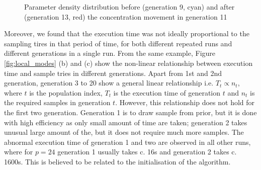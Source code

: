 \begin{figure}[t]
    \begin{center}
    \end{center}

    \caption[Parameter density distribution before and after the concentration movement in generation 11]{Parameter density distribution before (generation 9, cyan) and after (generation 13, red) the concentration movement in generation 11}
    \label{fig:local_para}
\end{figure}

Moreover, we found that the execution time was not ideally proportional to the sampling tires in that period of time, for both different repeated runs and different generations in a single run. From the same example, Figure \ref{fig:local_modes} (b) and (c) show the non-linear relationship between execution time and sample tries in different generations. Apart from 1st and 2nd generation, generation 3 to 20 show a general linear relationship i.e. $T_t\propto n_t$, where $t$ is the population index, $T_t$ is the execution time of generation $t$ and $n_t$ is the required samples in generation $t$. However, this relationship does not hold for the first two generation. Generation 1 is to draw sample from prior, but it is done with high efficiency as only small amount of time are taken; generation 2 takes unusual large amount of the, but it does not require much more samples. The abnormal execution time of generation 1 and two are observed in all other runs, where for $p=24$ generation 1 usually takes c. 16s and generation 2 takes c. 1600s. This is believed to be related to the initialisation of the algorithm. 

